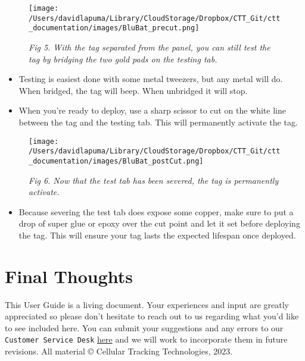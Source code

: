 \documentclass[
]{article}
\providecommand{\tightlist}{%
  \setlength{\itemsep}{0pt}\setlength{\parskip}{0pt}}
\begin{document}
\begin{figure}
\hypertarget{id}{%
\centering
\texttt{[image: /Users/davidlapuma/Library/CloudStorage/Dropbox/CTT\_Git/ctt\_documentation/images/BluBat\_precut.png]}
\caption{\emph{Fig 5. With the tag separated from the panel, you can
still test the tag by bridging the two gold pads on the testing
tab.}}\label{id}
}
\end{figure}

\begin{itemize}
\tightlist
\item
  Testing is easiest done with some metal tweezers, but any metal will
  do. When bridged, the tag will beep. When unbridged it will stop.
\item
  When you're ready to deploy, use a sharp scissor to cut on the white
  line between the tag and the testing tab. This will permanently
  activate the tag.
\end{itemize}

\begin{figure}
\hypertarget{id}{%
\centering
\texttt{[image: /Users/davidlapuma/Library/CloudStorage/Dropbox/CTT\_Git/ctt\_documentation/images/BluBat\_postCut.png]}
\caption{\emph{Fig 6. Now that the test tab has been severed, the tag is
permanently activate.}}\label{id}
}
\end{figure}

\begin{itemize}
\tightlist
\item
  Because severing the test tab does expose some copper, make sure to
  put a drop of super glue or epoxy over the cut point and let it set
  before deploying the tag. This will ensure your tag lasts the expected
  lifespan once deployed.
\end{itemize}

\hypertarget{final-thoughts}{%
\section{Final Thoughts}\label{final-thoughts}}

This User Guide is a living document. Your experiences and input are
greatly appreciated so please don't hesitate to reach out to us
regarding what you'd like to see included here. You can submit your
suggestions and any errors to our \texttt{Customer\ Service\ Desk}
\href{https://celltracktech.com/pages/customer-service-desk-csd}{here}
and we will work to incorporate them in future revisions. All material ©
Cellular Tracking Technologies, 2023.
\end{document}
